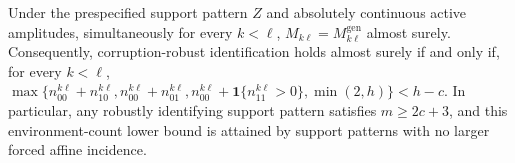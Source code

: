 Under the prespecified support pattern \(Z\) and absolutely continuous active amplitudes, simultaneously for every \(k<\ell\), \(M_{k\ell}=M_{k\ell}^{\mathrm{gen}}\) almost surely. Consequently, corruption-robust identification holds almost surely if and only if, for every \(k<\ell\), \(\max\{n_{00}^{k\ell}+n_{10}^{k\ell},n_{00}^{k\ell}+n_{01}^{k\ell},n_{00}^{k\ell}+\mathbf 1\{n_{11}^{k\ell}>0\},\min(2,h)\}<h-c\). In particular, any robustly identifying support pattern satisfies \(m\ge2c+3\), and this environment-count lower bound is attained by support patterns with no larger forced affine incidence.
